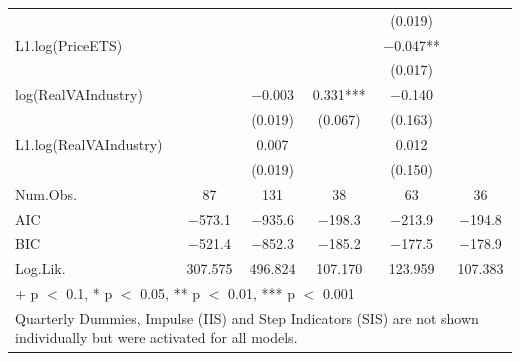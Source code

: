 \begin{table}
{\begin{tabular}[t]{lccccc}
 &  &  &  & (\num{0.019}) & \\
L1.log(PriceETS) &  &  &  & \num{-0.047}** & \\
 &  &  &  & (\num{0.017}) & \\
log(RealVAIndustry) &  & \num{-0.003} & \num{0.331}*** & \num{-0.140} & \\
 &  & (\num{0.019}) & (\num{0.067}) & (\num{0.163}) & \\
L1.log(RealVAIndustry) &  & \num{0.007} &  & \num{0.012} & \\
 &  & (\num{0.019}) &  & (\num{0.150}) & \\
\midrule
Num.Obs. & \num{87} & \num{131} & \num{38} & \num{63} & \num{36}\\
AIC & \num{-573.1} & \num{-935.6} & \num{-198.3} & \num{-213.9} & \num{-194.8}\\
BIC & \num{-521.4} & \num{-852.3} & \num{-185.2} & \num{-177.5} & \num{-178.9}\\
Log.Lik. & \num{307.575} & \num{496.824} & \num{107.170} & \num{123.959} & \num{107.383}\\
\bottomrule
\multicolumn{6}{l}{\rule{0pt}{1em}+ p $<$ 0.1, * p $<$ 0.05, ** p $<$ 0.01, *** p $<$ 0.001}\\
\multicolumn{6}{l}{\rule{0pt}{1em}Quarterly Dummies, Impulse (IIS) and Step Indicators (SIS) are not shown individually but were activated for all models.}\\
\end{tabular}}
\end{table}
